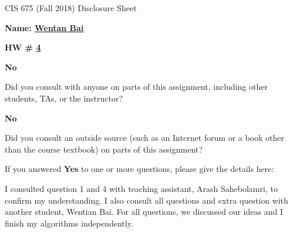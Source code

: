 \documentclass[12pt]{article}
\newcommand*\circled[1]{\tikz[baseline=(char.base)]{
            \node[shape=circle,draw,inner sep=2pt] (char) {#1};}}
\begin{document}
\begin{center}
  \Large
  CIS 675 (Fall 2018) Disclosure Sheet 
\end{center} 
\vspace*{2em}

\noindent
\textbf{\Large Name: \underline{ Wentan Bai }} 


\noindent 
\begin{minipage}[t]{1.0\linewidth}

\begin{minipage}[t]{0.25\linewidth}
\textbf{\Large
  HW \# \underline{ 4 }
} 

\end{minipage} \vspace*{3ex}




\begin{minipage}[t]{.8in}
  \textbf{\circled{Yes} \quad No}
\end{minipage}
\qquad 
\begin{minipage}[t]{5.5in}
  Did you consult with anyone on parts of this assignment, including other students, TAs, or the instructor? 
\end{minipage}
\vspace*{1ex}

\begin{minipage}[t]{.8in}
  \textbf{\circled{Yes} \quad No}
\end{minipage}
\qquad 
\begin{minipage}[t]{5.5in}
  Did you consult an outside source (such as an Internet forum or a
  book other than the course textbook) on parts of this assignment? 
\end{minipage}
\vspace*{1ex}

\noindent
  If you answered \textbf{Yes} to one or more questions, please give the details here: \vspace*{5ex} \par
  I consulted question 1 and 4 with teaching assistant, Arash Sahebolamri, to confirm my understanding. 
  I also consult all questions and extra question with another student, Wentian Bai. For all questions, we discussed our ideas and I finish my algorithms independently. 

 

\vfill
\end{minipage}



\vspace*{40ex}
\end{document}
